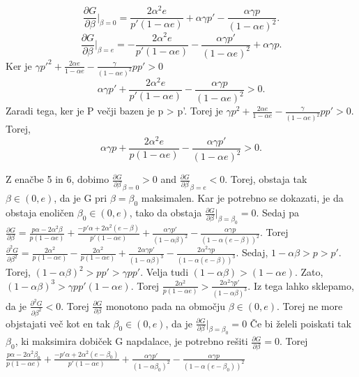 \documentclass{acm_proc_article-sp}
\begin{document}
\begin{equation}
\frac{\partial G}{\partial \beta} |_{\beta=0} = \frac{2\alpha^2 e}{p' (1 - \alpha e)} + \alpha\gamma p' - \frac{\alpha\gamma p }{(1 - \alpha e)^2}.
\end{equation}
\begin{equation}
\frac{\partial G}{\partial \beta} |_{\beta=e} = -\frac{2\alpha^2 e}{p' (1 - \alpha e)}- \frac{\alpha\gamma p' }{(1 - \alpha e)^2} + \alpha\gamma p.
\end{equation}
Ker je $\gamma p'^2 + \frac{2\alpha e}{1 - \alpha e} - \frac{\gamma}{(1 - \alpha e) ^ 2} p p' > 0$
\begin{equation}
\alpha\gamma p' + \frac{2\alpha^2 e}{p'(1 - \alpha e)} - \frac{\alpha\gamma p}{(1 - \alpha e)^2} > 0.
\end{equation}
Zaradi tega, ker je P večji bazen je p > p'. Torej je $\gamma p^2 + \frac{2\alpha e}{1 - \alpha e} - \frac{\gamma}{(1 - \alpha e)^2} p p' > 0$. Torej,
\begin{equation}
\alpha\gamma p + \frac{2\alpha^2 e}{p(1 - \alpha e)} - \frac{\alpha\gamma p'}{(1- \alpha e)^2} > 0.
\end{equation}

Z enačbe 5 in 6, dobimo $\frac{\partial G}{\partial \beta}_{\beta=0} > 0$ and $\frac{\partial G} {\partial \beta}_{\beta=e} < 0$. Torej, obstaja tak $\beta \in (0, e)$, da je G pri $\beta=\beta_0$ maksimalen. Kar je potrebno se dokazati, je da obstaja enoličen $\beta_0 \in (0,e)$, tako da obstaja $\frac{\partial G}{\partial \beta}|_{\beta=\beta_0} = 0$. Sedaj pa $\frac{\partial G}{\partial \beta} = \frac{p\alpha - 2\alpha^2 \beta}{p(1 - \alpha e)} + \frac{-p' \alpha + 2 \alpha^2(e - \beta)}{p' (1 - \alpha e)} + \frac{\alpha\gamma p'}{(1 - \alpha\beta)^2} - \frac{\alpha\gamma p}{(1 - \alpha(e- \beta))^2}$. Torej $\frac{\partial^2 G}{\partial \beta^2} = \frac{2\alpha^2}{p(1 - \alpha e)} - \frac{2 \alpha^2}{p(1 - \alpha e)} + \frac{2\alpha\gamma p'}{(1 - \alpha\beta)^3} - \frac{2\alpha^2 \gamma p}{(1 - \alpha(e - \beta))^3}$. Sedaj, $1 - \alpha\beta > p > p'$. Torej, $(1 - \alpha\beta)^2 > pp' > \gamma p p'$. Velja tudi $(1- \alpha\beta) > (1- \alpha e)$. Zato, $(1- \alpha\beta)^3 > \gamma p p'(1- \alpha e)$. Torej $\frac{2\alpha^2}{p(1 - \alpha e)} > \frac{2\alpha^2 \gamma p'}{(1 - \alpha\beta)^3}$. Iz tega lahko sklepamo, da je $\frac{\partial^2 G}{\partial \beta^2} < 0$. Torej $\frac{\partial G}{\partial \beta}$ monotono pada na območju $\beta \in (0, e)$. Torej ne more objstajati več kot en tak $\beta_0 \in (0, e)$, da je $\frac{\partial G}{\partial \beta}|_{\beta=\beta_0} = 0$
\newline
\newline
Če bi želeli poiskati tak $\beta_0$, ki maksimira dobiček G napdalace, je potrebno rešiti $\frac{\partial G}{\partial \beta} = 0$. Torej $\frac{p \alpha - 2\alpha^2 \beta_0}{p(1 - \alpha e)} + \frac{-p'\alpha + 2\alpha^2(e - \beta_0)}{p'(1- \alpha e)} + \frac{\alpha\gamma p'}{(1 - \alpha\beta_0)^2} - \frac{\alpha\gamma p}{(1- \alpha(e - \beta_0))^2}$
\end{document}
